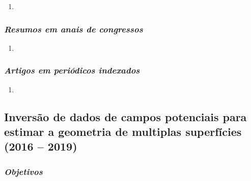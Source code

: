 \begin{enumerate}
	
	\item{}
	
\end{enumerate}

\subsubsection{\emph{Resumos em anais de congressos}}

\begin{enumerate}
	\item {}
\end{enumerate}

\subsubsection{\emph{Artigos em periódicos indexados}}

\begin{enumerate}
	\item {}
	
\end{enumerate}


\subsection{Inversão de dados de campos potenciais para estimar a geometria de multiplas superfícies (2016 -- 2019)} \label{projeto-Marcela}

\subsubsection{\emph{Objetivos}}

